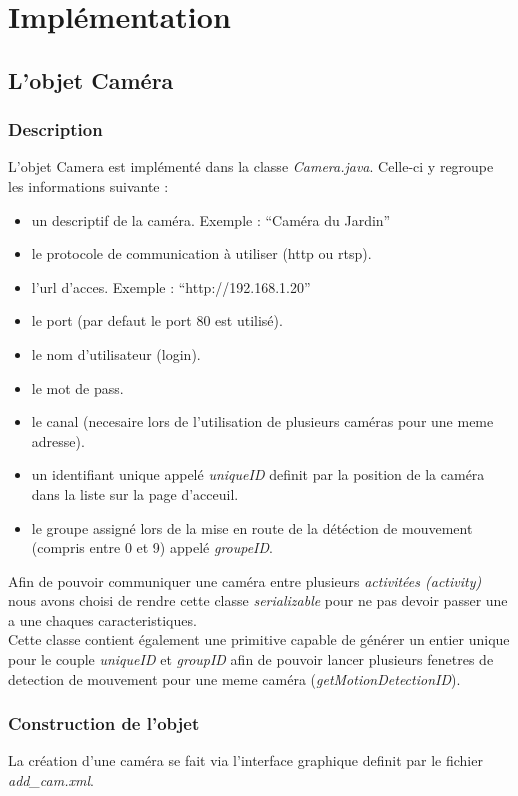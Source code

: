 \chapter{Implémentation}
\section{L'objet Caméra}
\subsection{Description}
L'objet Camera est implémenté dans la classe \textit{Camera.java}.\newline
Celle-ci y regroupe les informations suivante : 
\begin{itemize} 
\item un descriptif de la caméra. Exemple : ``Caméra du Jardin''
\item le protocole de communication à utiliser (http ou rtsp).
\item l'url d'acces. Exemple : ``http://192.168.1.20''
\item le port (par defaut le port 80 est utilisé).
\item le nom d'utilisateur (login).
\item le mot de pass.
\item le canal (necesaire lors de l'utilisation de plusieurs caméras pour une
meme adresse).
\item un identifiant unique appelé \textit{uniqueID} definit par la position de
la caméra dans la liste sur la page d'acceuil.
\item le groupe assigné lors de la mise en route de la détéction de mouvement
(compris entre 0 et 9) appelé \textit{groupeID}.\\
\end{itemize}
Afin de pouvoir communiquer une caméra entre plusieurs \textit{activitées
(activity)} nous avons choisi de rendre cette classe \textit{serializable} pour
ne pas devoir passer une a une chaques caracteristiques.\\
Cette classe contient également une primitive capable de générer un entier
unique pour le couple \textit{uniqueID} et \textit{groupID} afin de pouvoir
lancer plusieurs fenetres de detection de mouvement pour une meme caméra
(\textit{getMotionDetectionID}).
\subsection{Construction de l'objet}
La création d'une caméra se fait via l'interface graphique definit par le
fichier \textit{add\_cam.xml}.\newline

